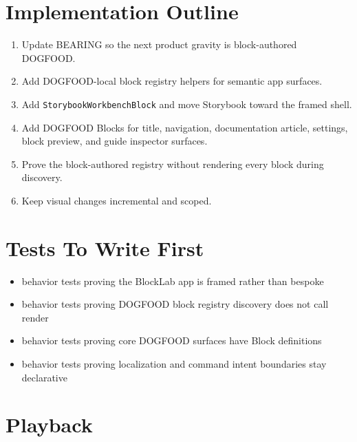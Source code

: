 \section{Implementation Outline}\label{record-109-implementation-outline}

\begin{enumerate}
\def\labelenumi{\arabic{enumi}.}
\tightlist
\item
  Update BEARING so the next product gravity is block-authored DOGFOOD.
\item
  Add DOGFOOD-local block registry helpers for semantic app surfaces.
\item
  Add \texttt{S\allowbreak{}t\allowbreak{}o\allowbreak{}r\allowbreak{}y\allowbreak{}b\allowbreak{}o\allowbreak{}o\allowbreak{}k\allowbreak{}W\allowbreak{}o\allowbreak{}r\allowbreak{}k\allowbreak{}b\allowbreak{}e\allowbreak{}n\allowbreak{}c\allowbreak{}h\allowbreak{}B\allowbreak{}l\allowbreak{}o\allowbreak{}c\allowbreak{}k} and move Storybook toward the framed shell.
\item
  Add DOGFOOD Blocks for title, navigation, documentation article, settings, block preview, and guide inspector surfaces.
\item
  Prove the block-authored registry without rendering every block during discovery.
\item
  Keep visual changes incremental and scoped.
\end{enumerate}

\section{Tests To Write First}\label{record-109-tests-to-write-first}

\begin{itemize}
\tightlist
\item
  behavior tests proving the BlockLab app is framed rather than bespoke
\item
  behavior tests proving DOGFOOD block registry discovery does not call render
\item
  behavior tests proving core DOGFOOD surfaces have Block definitions
\item
  behavior tests proving localization and command intent boundaries stay declarative
\end{itemize}

\section{Playback}\label{record-109-playback}

